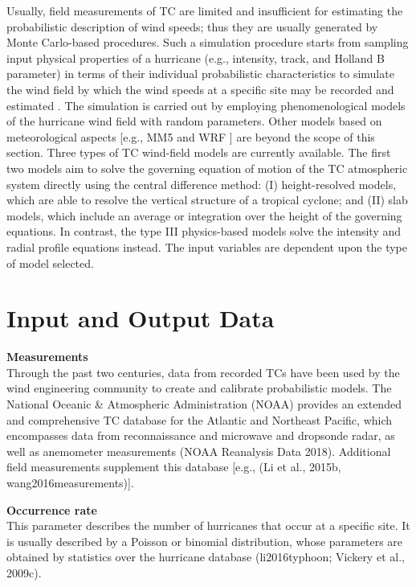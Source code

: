Usually, field measurements of TC are limited and insufficient for estimating the probabilistic description of wind speeds; thus they are usually generated by Monte Carlo-based procedures. Such a simulation procedure starts from sampling input physical properties of a hurricane (e.g., intensity, track, and Holland B parameter) in terms of their individual probabilistic characteristics to simulate the wind field by which the wind speeds at a specific site may be recorded and estimated \citep{russell1969probability}. The simulation is carried out by employing phenomenological models of the hurricane wind field with random parameters. Other models based on meteorological aspects [e.g., MM5 \citep{liu1997multiscale} and WRF \citep{davis2008prediction}] are beyond the scope of this section. Three types of TC wind-field models are currently available. The first two models aim to solve the governing equation of motion of the TC atmospheric system directly using the central difference method: (I) height-resolved models, which are able to resolve the vertical structure of a tropical cyclone; and (II) slab models, which include an average or integration over the height of the governing equations. In contrast, the type III physics-based models solve the intensity and radial profile equations instead. The input variables are dependent upon the type of model selected.

\section{Input and Output Data}
\label{sec:storm_wind_io}

\noindent\textbf{Measurements} \\Through the past two centuries, data from recorded TCs have been used by the wind engineering community to create and calibrate probabilistic models. The National Oceanic \& Atmospheric Administration (NOAA) provides an extended and comprehensive TC database for the Atlantic and Northeast Pacific, which encompasses data from reconnaissance and microwave and dropsonde radar, as well as anemometer measurements (NOAA Reanalysis Data 2018). Additional field measurements supplement this database [e.g., (Li et al., 2015b, wang2016measurements)].
\newline

\noindent\textbf{Occurrence rate} \\This parameter describes the number of hurricanes that occur at a specific site. It is usually described by a Poisson or binomial distribution, whose parameters are obtained by statistics over the hurricane database (li2016typhoon; Vickery et al., 2009c).
\newline

